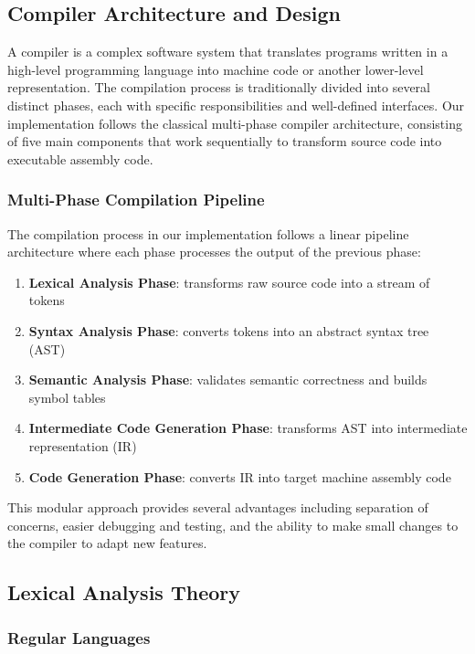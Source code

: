 \documentclass[12pt, letterpaper]{article}
\begin{document}
\subsection*{Compiler Architecture and Design}

A compiler is a complex software system that translates programs written in a high-level programming language into machine code or another lower-level representation. The compilation process is traditionally divided into several distinct phases, each with specific responsibilities and well-defined interfaces. Our implementation follows the classical multi-phase compiler architecture, consisting of five main components that work sequentially to transform source code into executable assembly code.

\subsubsection*{Multi-Phase Compilation Pipeline}

The compilation process in our implementation follows a linear pipeline architecture where each phase processes the output of the previous phase:

\begin{enumerate}
    \item \textbf{Lexical Analysis Phase}: transforms raw source code into a stream of tokens
    \item \textbf{Syntax Analysis Phase}: converts tokens into an abstract syntax tree (AST)
    \item \textbf{Semantic Analysis Phase}: validates semantic correctness and builds symbol tables
    \item \textbf{Intermediate Code Generation Phase}: transforms AST into intermediate representation (IR)
    \item \textbf{Code Generation Phase}: converts IR into target machine assembly code
\end{enumerate}

This modular approach provides several advantages including separation of concerns, easier debugging and testing, and the ability to make small changes to the compiler to adapt new features.

\subsection*{Lexical Analysis Theory}

\subsubsection*{Regular Languages}
\end{document}
